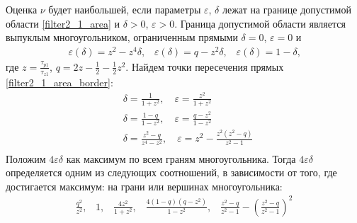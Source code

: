 \documentclass[a4paper,article,14pt]{extarticle}
\begin{document}
Оценка $\nu$ будет наибольшей, если параметры $\varepsilon$, $\delta$ лежат на границе допустимой области \eqref{filter2_1_area} и $\delta > 0$, $\varepsilon > 0$. Граница допустимой области является  выпуклым многоугольником, ограниченным прямыми $\delta = 0$, $\varepsilon = 0$ и
 \begin{equation}\label{filter2_1_area_border}
\begin{aligned}
\varepsilon(\delta)=z^2 - z^4\delta \text{,} \quad \varepsilon(\delta)=q - z^2\delta \text{,}
\quad \varepsilon(\delta)=1 - \delta \text{,}
\end{aligned}
\end{equation}
где $z = \frac{\tau_{p1}}{\tau_{z1}}$, $q = 2z - \frac{1}{2} - \frac{1}{2}z^2$. Найдем точки пересечения прямых \eqref{filter2_1_area_border}:
  \begin{equation}
 \begin{aligned}
&\delta = \frac{1}{1+z^2}, \quad \varepsilon = \frac{z^2}{1+z^2}\\
&\delta = \frac{1-q}{1-z^2}, \quad  \varepsilon = \frac{q-z^2}{1-z^2}\\
&\delta = \frac{z^2-q}{z^4-z^2}, \quad  \varepsilon = z^2 - \frac{z^2(z^2-q)}{z^2-1}\\
 \end{aligned}
\end{equation}
Положим $4\varepsilon\delta$ как максимум по всем граням многоугольника. Тогда $4\varepsilon\delta$ определяется одним из следующих соотношений, в зависимости от того, где достигается максимум: на грани или вершинах многоугольника:
 \begin{equation}\label{filter2_max}
\begin{aligned}
\frac{q^2}{z^2}\text{,} \quad 1 \text{,} \quad \frac{4z^2}{1+z^2} \text{,} \quad \frac{4(1-q)(q-z^2)}{1-z^2} \text{,} \quad \frac{z^2-q}{z^2-1} - \left(\frac{z^2-q}{z^2-1}\right)^2
\end{aligned}
\end{equation}

\end{document}
